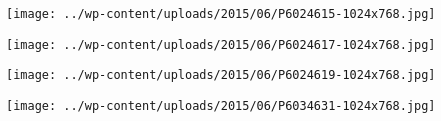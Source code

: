  

 

\begin{center} \texttt{[image: ../wp-content/uploads/2015/06/P6024615-1024x768.jpg]} \end{center}

 

 

\begin{center} \texttt{[image: ../wp-content/uploads/2015/06/P6024617-1024x768.jpg]} \end{center}

 

 

\begin{center} \texttt{[image: ../wp-content/uploads/2015/06/P6024619-1024x768.jpg]} \end{center}

 

 

\begin{center} \texttt{[image: ../wp-content/uploads/2015/06/P6034631-1024x768.jpg]} \end{center}




 
 

